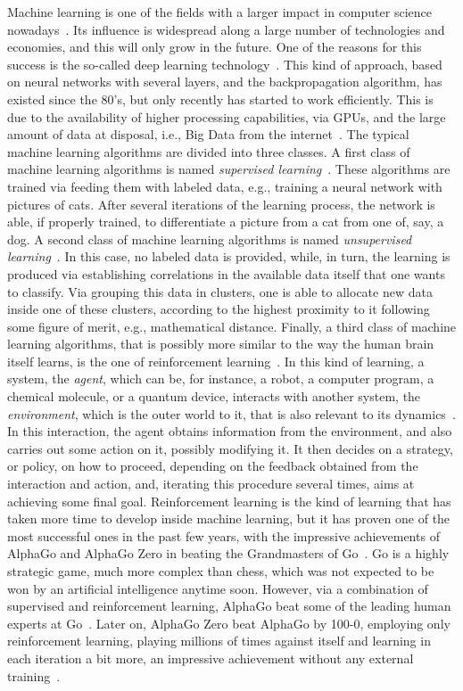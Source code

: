 \documentclass[12pt]{iopart}
\begin{document}
Machine learning is one of the fields with a larger impact in computer science nowadays~\cite{RussellAI}. Its influence is widespread along a large number of technologies and economies, and this will only grow in the future. One of the reasons for this success is the so-called deep learning technology~\cite{HintonNature}. This kind of approach, based on neural networks with several layers, and the backpropagation algorithm, has existed since the 80's, but only recently has started to work efficiently. This is due to the availability of higher processing capabilities, via GPUs, and the large amount of data at disposal, i.e., Big Data from the internet~\cite{HintonNature}. The typical machine learning algorithms are divided into three classes. A first class of machine learning algorithms is named {\it supervised learning}~\cite{RussellAI}. These algorithms are trained via feeding them with labeled data, e.g., training a neural network with pictures of cats. After several iterations of the learning process, the network is able, if properly trained, to differentiate a picture from a cat from one of, say, a dog. A second class of machine learning algorithms is named {\it unsupervised learning}~\cite{RussellAI}. In this case, no labeled data is provided, while, in turn, the learning is produced via establishing correlations in the available data itself that one wants to classify. Via grouping this data in clusters, one is able to allocate new data inside one of these clusters, according to the highest proximity to it following some figure of merit, e.g., mathematical distance. Finally, a third class of machine learning algorithms, that is possibly more similar to the way the human brain itself learns, is the one of reinforcement learning~\cite{RussellAI,SuttonBarto}. In this kind of learning, a system, the {\it agent}, which can be, for instance, a robot, a computer program, a chemical molecule, or a quantum device, interacts with another system, the {\it environment}, which is the outer world to it, that is also relevant to its dynamics~\cite{RussellAI,SuttonBarto}. In this interaction, the agent obtains information from the environment, and also carries out some action on it, possibly modifying it. It then decides on a strategy, or policy, on how to proceed, depending on the feedback obtained from the interaction and action, and, iterating this procedure several times, aims at achieving some final goal. Reinforcement learning is the kind of learning that has taken more time to develop inside machine learning, but it has proven one of the most successful ones in the past few years, with the impressive achievements of AlphaGo and AlphaGo Zero in beating the Grandmasters of Go~\cite{AlphaGo,AlphaGoZero}. Go is a highly strategic game, much more complex than chess, which was not expected to be won by an artificial intelligence anytime soon. However, via a combination of supervised and reinforcement learning, AlphaGo beat some of the leading human experts at Go~\cite{AlphaGo}. Later on, AlphaGo Zero beat AlphaGo by 100-0, employing only reinforcement learning, playing millions of times against itself and learning in each iteration a bit more, an impressive achievement without any external training~\cite{AlphaGoZero}.
\end{document}
